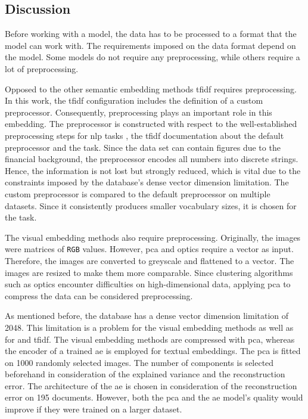 \subsection{Discussion}\label{subsec:discussion}

Before working with a model, the data has to be processed to a format that the model can work with.
The requirements imposed on the data format depend on the model.
Some models do not require any preprocessing, while others require a lot of preprocessing.

Opposed to the other semantic embedding methods \ac{tfidf} requires preprocessing.
In this work, the \ac{tfidf} configuration includes the definition of a custom preprocessor.
Consequently, preprocessing plays an important role in this embedding.
The preprocessor is constructed with respect to the well-established preprocessing steps for \ac{nlp} tasks \cite{nlp-book2009},
the \ac{tfidf} documentation about the default preprocessor and the task.
Since the data set can contain figures due to the financial background, the preprocessor encodes all numbers into discrete strings.
Hence, the information is not lost but strongly reduced, which is vital due to the constraints imposed 
by the database's dense vector dimension limitation.
The custom preprocessor is compared to the default preprocessor on multiple datasets.
Since it consistently produces smaller vocabulary sizes, it is chosen for the task.

The visual embedding methods also require preprocessing.
Originally, the images were matrices of \texttt{RGB} values.
However, \ac{pca} and \ac{optics} require a vector as input.
Therefore, the images are converted to greyscale and flattened to a vector.
The images are resized to make them more comparable.
Since clustering algorithms such as \ac{optics} encounter difficulties on high-dimensional data, 
applying \ac{pca} to compress the data can be considered preprocessing.


As mentioned before, the database has a dense vector dimension limitation of 2048.
This limitation is a problem for the visual embedding methods as well as for \infersent{} and 
\ac{tfidf}.
The visual embedding methods are compressed with \ac{pca}, 
whereas the encoder of a trained \ac{ae} is employed for textual embeddings.
The \ac{pca} is fitted on 1000 randomly selected images.
The number of components is selected beforehand in consideration of the explained variance and the reconstruction error.
The architecture of the \ac{ae} is chosen in consideration of the reconstruction error on 195 documents.
However, both the \ac{pca} and the \ac{ae} model's quality would improve if they were trained on a larger dataset.


